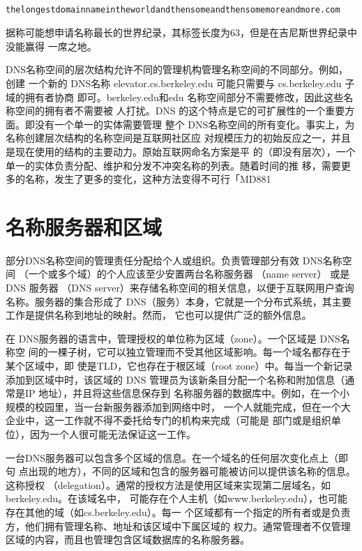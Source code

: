 \begin{verbatim}
    thelongestdomainnameintheworldandthensomeandthensomemoreandmore.com
\end{verbatim}

据称可能想申请名称最长的世界纪录，其标签长度为63，但是在吉尼斯世界纪录中没能赢得
一席之地。

DNS名称空间的层次结构允许不同的管理机构管理名称空间的不同部分。例如，创建
一个新的 DNS名称 elevator.cs.berkeley.edu 可能只需要与 cs.berkeley.edu 子域的拥有者协商
即可。berkeley.edu和edu 名称空间部分不需要修改，因此这些名称空间的拥有者不需要被
人打扰。DNS 的这个特点是它的可扩展性的一个重要方面。即没有一个单一的实体需要管理
整个 DNS名称空间的所有变化。事实上，为名称创建层次结构的名称空间是互联网社区应
对规模压力的初始反应之一，并且是现在使用的结构的主要动力。原始互联网命名方案是平
的（即没有层次），一个单一的实体负责分配、维护和分发不冲突名称的列表。随着时间的推
移，需要更多的名称，发生了更多的变化，这种方法变得不可行「MD881

\section{名称服务器和区域}

部分DNS名称空间的管理责任分配给个人或组织。负责管理部分有效 DNS名称空间
（一个或多个域）的个人应该至少安置两台名称服务器 （name server） 或是 DNS 服务器 （DNS
server）来存储名称空间的相关信息，以便于互联网用户查询名称。服务器的集合形成了
DNS（服务）本身，它就是一个分布式系统，其主要工作是提供名称到地址的映射。然而，
它也可以提供广泛的额外信息。

在 DNS服务器的语言中，管理授权的单位称为区域（zone）。一个区域是 DNS名称空
间的一棵子树，它可以独立管理而不受其他区域影响。每一个域名都存在于某个区域中，即
使是TLD，它也存在于根区域（root zone）中。每当一个新记录添加到区域中时，该区域的
DNS 管理员为该新条目分配一个名称和附加信息（通常是IP 地址），并且将这些信息保存到
名称服务器的数据库中。例如，在一个小规模的校园里，当一台新服务器添加到网络中时，
一个人就能完成，但在一个大企业中，这一工作就不得不委托给专门的机构来完成（可能是
部门或是组织单位），因为一个人很可能无法保证这一工作。

一台DNS服务器可以包含多个区域的信息。在一个域名的任何层次变化点上（即句
点出现的地方），不同的区域和包含的服务器可能被访问以提供该名称的信息。这称授权
（delegation）。通常的授权方法是使用区域来实现第二层域名，如berkeley.edu。在该域名中，
可能存在个人主机（如www.berkeley.edu），也可能存在其他的域（如cs.berkeley.edu）。每一
个区域都有一个指定的所有者或是负责方，他们拥有管理名称、地址和该区域中下属区域的
权力。通常管理者不仅管理区域的内容，而且也管理包含区域数据库的名称服务器。

